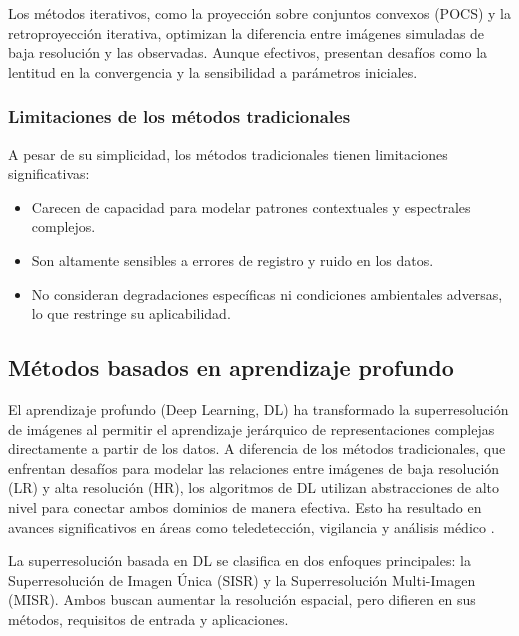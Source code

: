             Los métodos iterativos, como la proyección sobre conjuntos convexos (POCS) y la retroproyección iterativa, optimizan la diferencia entre imágenes simuladas de baja resolución y las observadas. Aunque efectivos, presentan desafíos como la lentitud en la convergencia y la sensibilidad a parámetros iniciales.
            
        \subsubsection{Limitaciones de los métodos tradicionales}
        
            A pesar de su simplicidad, los métodos tradicionales tienen limitaciones significativas:
            \begin{itemize}
                \item Carecen de capacidad para modelar patrones contextuales y espectrales complejos.
                \item Son altamente sensibles a errores de registro y ruido en los datos.
                \item No consideran degradaciones específicas ni condiciones ambientales adversas, lo que restringe su aplicabilidad.
            \end{itemize}


    \subsection{Métodos basados en aprendizaje profundo}

        El aprendizaje profundo (Deep Learning, DL) ha transformado la superresolución de imágenes al permitir el aprendizaje jerárquico de representaciones complejas directamente a partir de los datos. A diferencia de los métodos tradicionales, que enfrentan desafíos para modelar las relaciones entre imágenes de baja resolución (LR) y alta resolución (HR), los algoritmos de DL utilizan abstracciones de alto nivel para conectar ambos dominios de manera efectiva. Esto ha resultado en avances significativos en áreas como teledetección, vigilancia y análisis médico \textcite{rohith2021paradigm}.
        
        
        La superresolución basada en DL se clasifica en dos enfoques principales: la Superresolución de Imagen Única (SISR) y la Superresolución Multi-Imagen (MISR). Ambos buscan aumentar la resolución espacial, pero difieren en sus métodos, requisitos de entrada y aplicaciones.
        
